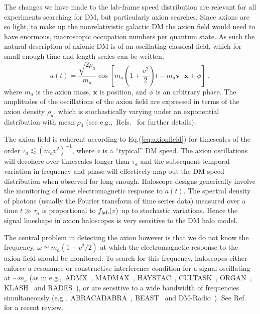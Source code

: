 \documentclass[prd,10pt,twocolumn,showpacs,nofootinbib,aps,superscriptaddress,preprintnumbers]{revtex4-1}
\begin{document}
  The changes we have made to the lab-frame speed distribution are
  relevant for all experiments searching for DM, but
  particularly axion searches. Since axions are so light, to make up the nonrelativistic galactic DM the axion field would need to have enormous, macroscopic occupation numbers per quantum state. As such the natural description of axionic DM is of an oscillating classical field, which for small enough time and length-scales can be written,
  \begin{equation}\label{eq:axionfield}
  a(t) = \frac{\sqrt{2\rho_a}}{m_a} \cos{\left[ m_a\left(1+ \frac{v^2}{2}\right) t - m_a \mathbf{v}\cdot\mathbf{x} + \phi\right]}\;,
  \end{equation}
  where $m_a$ is the axion mass, $\mathbf{x}$ is position, and $\phi$ is
  an arbitrary phase. The amplitudes of the oscillations of the axion field are expressed in terms of the axion density $\rho_a$, which is
  stochastically varying under an exponential distribution with mean
  $\rho_0$ (see e.g.,\ Refs.~\cite{Centers:2019dyn,Derevianko:2016vpm,
    Knirck:2018knd} for further details).

  The axion field is coherent according to Eq.(\ref{eq:axionfield}) for
  timescales of the order $\tau_a \lesssim (m_a v^2)^{-1}$, where $v$ is a
  ``typical'' DM speed. The axion
  oscillations will decohere over timescales longer than $\tau_a$ and
  the subsequent temporal variation in frequency and phase will
  effectively map out the DM speed distribution when observed
  for long enough. Haloscope designs generically
  involve the monitoring of some electromagnetic response to $a(t)$. The
  spectral density of photons (usually the Fourier transform of
  time series data) measured over a time $t\gg \tau_a$ is
  proportional to $f_{\rm{lab}}(v)$ up to stochastic variations. Hence the signal lineshape in axion
  haloscopes is very sensitive to the DM halo model.

  The central problem in detecting the axion however is that we do not
  know the frequency, $\omega\simeq m_a(1+v^2/2)$ at which the
  electromagnetic response to the axion field should be monitored. To
  search for this frequency, haloscopes either enforce a resonance or
  constructive interference condition for a signal oscillating at
  $\sim m_a$ (as in e.g.,~ADMX~\cite{Asztalos:2009yp,Du:2018uak},
  MADMAX~\cite{TheMADMAXWorkingGroup:2016hpc,Millar:2016cjp},
  HAYSTAC~\cite{Brubaker:2016ktl,Rapidis:2017ytq,Brubaker:2017rna,Zhong:2017fot},
  CULTASK~\cite{Chung:2016ysi,Lee:2017mff,Chung:2017ibl},
  ORGAN~\cite{McAllister:2017lkb,McAllister:2017ern},
  KLASH~\cite{Alesini:2017ifp} and RADES~\cite{Melcon:2018dba}), or are
  sensitive to a wide bandwidth of frequencies simultaneously
  (e.g.,\ ABRACADABRA~\cite{Kahn:2016aff,Ouellet:2018beu,Ouellet:2019tlz},
  BEAST~\cite{McAllister:2018ndu} and
  DM-Radio~\cite{Silva-Feaver:2016qhh}). See Ref.~\cite{Irastorza:2018dyq} for a recent review.
  
\end{document}
